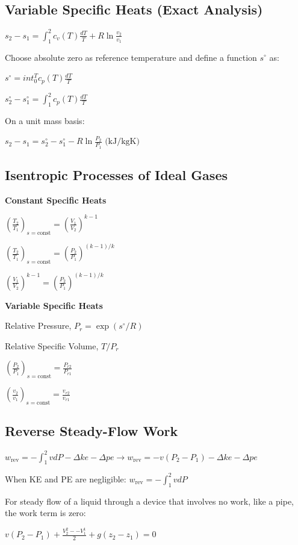 \documentclass{article}
\begin{document}
\begin{multicols}{3}
    \subsection*{Variable Specific Heats (Exact Analysis)}
    $s_2-s_1=\int_1^2c_v(T)\frac{dT}{T}+R\ln{\frac{v_2}{v_1}}$\par 
    Choose absolute zero as reference temperature and define a function $s^\circ$ as:\par 
    $s^\circ=int_0^Tc_p(T)\frac{dT}{T}$\par 
    $s_2^\circ-s_1^\circ=\int_1^2c_p(T)\frac{dT}{T}$\par 
    On a unit mass basis: \par 
    $s_2-s_1=s_2^\circ-s_1^\circ-R\ln\frac{P_2}{P_1}\text{ (kJ/kgK)}$\par 
    \subsection*{Isentropic Processes of Ideal Gases}
    \textbf{Constant Specific Heats}\par
    $\left(\frac{T_2}{T_1}\right)_{s=\text{const}}=\left(\frac{V_1}{V_2}\right)^{k-1}$\par 
    $\left(\frac{T_2}{T_1}\right)_{s=\text{const}}=\left(\frac{P_2}{P_1}\right)^{(k-1)/k}$\par 
    $\left(\frac{V_1}{V_2}\right)^{k-1}=\left(\frac{P_2}{P_1}\right)^{(k-1)/k}$\par
    \textbf{Variable Specific Heats}\par 
    Relative Pressure, $P_r = \exp{(s^\circ/R)}$\par 
    Relative Specific Volume, $T/P_r$\par 
    $\left(\frac{P_2}{P_1}\right)_{s=\text{const}} = \frac{P_{r2}}{P_{r1}}$\par 
    $\left(\frac{v_2}{v_1}\right)_{s=\text{const}} = \frac{v_{r2}}{v_{r1}}$\par
    \subsection*{Reverse Steady-Flow Work}
    $w_\text{rev}=-\int_1^2 vdP-\Delta ke-\Delta pe\rightarrow w_\text{rev}=-v(P_2-P_1)-\Delta ke-\Delta pe$\par 
    When KE and PE are negligible: $w_\text{rev}=-\int_1^2 vdP$\par 
    For steady flow of a liquid through a device that involves no work, like a pipe, the work term is zero:\par 
    $v(P_2-P_1)+\frac{V_2^2--V_1^1}{2}+g(z_2-z_1)=0$

\end{multicols}
\end{document}
